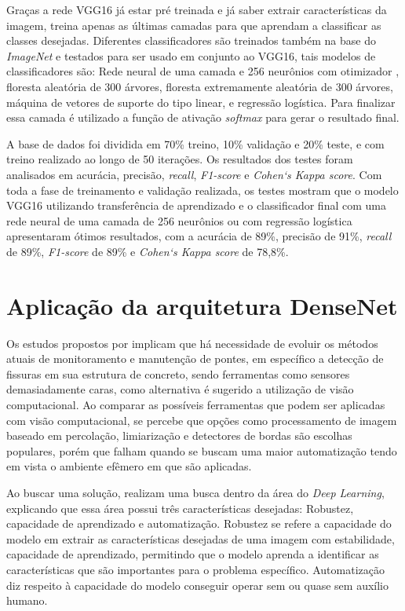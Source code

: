 Graças a rede VGG16 já estar pré treinada e já saber extrair características da imagem, \cite{gopalakrishnan2018crack} treina apenas as últimas camadas para que aprendam a classificar as classes desejadas. 
Diferentes classificadores são treinados também na base do \textit{ImageNet} e testados para ser usado em conjunto ao VGG16, tais modelos de classificadores são: Rede neural de uma camada e 256 neurônios com otimizador  \cite{kingma2014adam}, floresta aleatória de 300 árvores, floresta extremamente aleatória de 300 árvores, máquina de vetores de suporte do tipo linear, e regressão logística.
Para finalizar essa camada é utilizado a função de ativação \textit{softmax} para gerar o resultado final.

A base de dados foi dividida em 70\% treino, 10\% validação e 20\% teste, e com treino realizado ao longo de 50 iterações.
Os resultados dos testes foram analisados em acurácia, precisão, \textit{recall}, \textit{F1-score} e \textit{Cohen`s Kappa score}.
Com toda a fase de treinamento e validação realizada, os testes mostram que o modelo VGG16 utilizando transferência de aprendizado e o classificador final com uma rede neural de uma camada de 256 neurônios ou com regressão logística apresentaram ótimos resultados, com a acurácia de 89\%, precisão de 91\%, \textit{recall} de 89\%, \textit{F1-score} de 89\% e \textit{Cohen`s Kappa score} de 78,8\%.

\section{Aplicação da arquitetura DenseNet}

Os estudos propostos por  implicam que há necessidade de evoluir os métodos atuais de monitoramento e manutenção de pontes, em específico  a detecção de fissuras em sua estrutura de concreto, sendo ferramentas como sensores demasiadamente caras, como alternativa é sugerido a utilização de visão computacional. 
Ao comparar as possíveis ferramentas que podem ser aplicadas com visão computacional, se percebe que opções como processamento de imagem baseado em percolação, limiarização e detectores de bordas são escolhas populares, porém que falham quando se buscam uma maior automatização tendo em vista o ambiente efêmero em que são aplicadas.

Ao buscar uma solução,  realizam uma busca dentro da área do \textit{Deep Learning}, explicando que essa área possui três características desejadas: Robustez, capacidade de aprendizado e automatização. 
Robustez se refere a capacidade do modelo em extrair as características desejadas de uma imagem com estabilidade, capacidade de aprendizado, permitindo que o modelo aprenda a identificar as características que são importantes para o problema específico. 
Automatização diz respeito à capacidade do modelo conseguir operar sem ou quase sem auxílio  humano.

